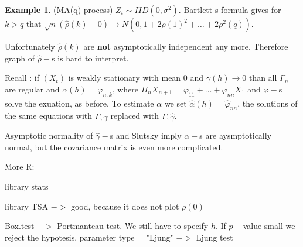 \documentclass[12pt,a4paper]{amsart}
\theoremstyle{definition} %
\newtheorem{example}[defn]{Example}
\theoremstyle{plain} %
\begin{document}
\begin{example} (MA(q) process)
$Z_t \sim IID(0, \sigma^2)$. Bartlett-s formula gives for $k > q$ that 
$\sqrt{n} (\hat{\rho}(k) - 0) \rightarrow N(0, 1 + 2\rho(1)^2 + \dots + 2\rho^2(q))$.

Unfortunately $\hat{\rho}(k)$ are {\bf not} asymptotically independent any more. Therefore graph of $\hat{\rho}-$s is hard to interpret.
\end{example}

Recall : if $(X_t)$ is weakly stationary with mean $0$ and $\gamma(h) \rightarrow 0$ than all $\Gamma_n$ are regular and 
$\alpha(h) = \varphi_{n,k}$, where $\Pi_{n} X_{n+1} = \varphi_{11} + \dots + \varphi_{n n}X_1$ and $\varphi -$s solve the exuation, as before.
To estimate $\alpha$ we set $\hat{\alpha}(h) = \hat{\varphi}_{nn}$, the solutions of the same equations with $\Gamma, \gamma$ replaced with $\hat{\Gamma}, \hat{\gamma}$. 

Asymptotic normality of $\hat{\gamma}-$s and Slutsky imply $\alpha -$s are aysmptotically normal, but the covariance matrix is even more complicated.  

\vskip1cm

More R:

library stats

library TSA $->$ good, because it does not plot $\rho(0)$

Box.test $->$ Portmanteau test. We still have to specify $h$. If $p-$value small we reject the hypotesis.
parameter type = "Ljung" $->$ Ljung test
\end{document}
